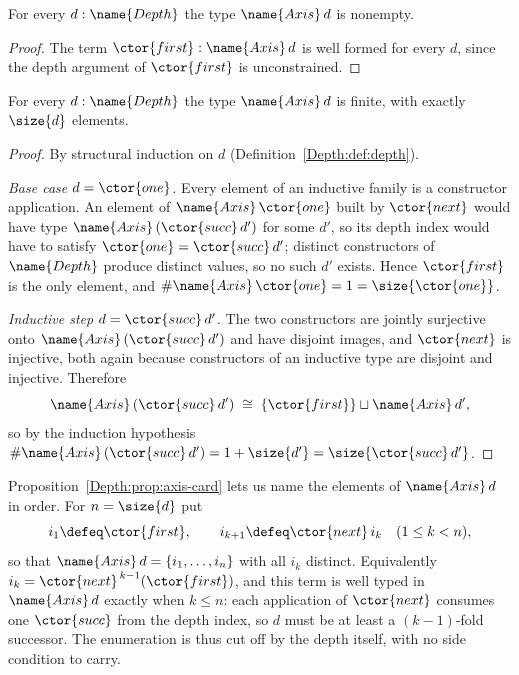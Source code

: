 \begin{proposition}\label{Depth:prop:axis-inhabited}
For every $d : \name{Depth}$ the type $\name{Axis}\,d$ is nonempty.
\end{proposition}

\begin{proof}
The term $\ctor{first} : \name{Axis}\,d$ is well formed for every $d$, since the depth
argument of $\ctor{first}$ is unconstrained.
\end{proof}

\begin{proposition}\label{Depth:prop:axis-card}
For every $d : \name{Depth}$ the type $\name{Axis}\,d$ is finite, with exactly
$\size{d}$ elements.
\end{proposition}

\begin{proof}
By structural induction on $d$ (Definition~\ref{Depth:def:depth}).

\emph{Base case $d = \ctor{one}$.}  Every element of an inductive family is a
constructor application.  An element of $\name{Axis}\,\ctor{one}$ built by $\ctor{next}$ would
have type $\name{Axis}\,(\ctor{succ}\, d')$ for some $d'$, so its depth index would have to
satisfy $\ctor{one} = \ctor{succ}\, d'$; distinct constructors of $\name{Depth}$ produce distinct
values, so no such $d'$ exists.  Hence $\ctor{first}$ is the only element, and
$\#\name{Axis}\,\ctor{one} = 1 = \size{\ctor{one}}$.

\emph{Inductive step $d = \ctor{succ}\, d'$.}  The two constructors are jointly
surjective onto $\name{Axis}\,(\ctor{succ}\, d')$ and have disjoint images, and $\ctor{next}$ is
injective, both again because constructors of an inductive type are disjoint
and injective.  Therefore
\[
  \name{Axis}\,(\ctor{succ}\, d') \;\cong\; \{\ctor{first}\} \sqcup \name{Axis}\,d',
\]
so by the induction hypothesis
$\#\name{Axis}\,(\ctor{succ}\, d') = 1 + \size{d'} = \size{\ctor{succ}\, d'}$.
\end{proof}

\begin{notation}\label{Depth:not:axis-enum}
Proposition~\ref{Depth:prop:axis-card} lets us name the elements of $\name{Axis}\,d$ in
order.  For $n = \size{d}$ put
\[
  i_1 \defeq \ctor{first},
  \qquad
  i_{k+1} \defeq \ctor{next}\,i_k \quad (1 \leq k < n),
\]
so that $\name{Axis}\,d = \{i_1, \dots, i_n\}$ with all $i_k$ distinct.  Equivalently
$i_k = \ctor{next}^{\,k-1}(\ctor{first})$, and this term is well typed in $\name{Axis}\,d$
exactly when $k \leq n$: each application of $\ctor{next}$ consumes one $\ctor{succ}$ from
the depth index, so $d$ must be at least a $(k-1)$-fold successor.  The
enumeration is thus cut off by the depth itself, with no side condition to
carry.
\end{notation}

